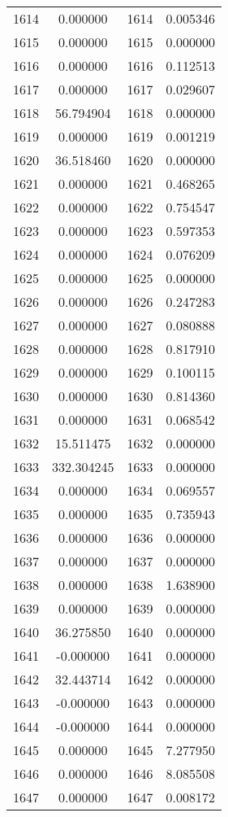 \documentclass[12pt]{article}
\begin{document}
\begin{longtable}{@{}cccc@{}}
1614 & 0.000000 & 1614 & 0.005346 \\
1615 & 0.000000 & 1615 & 0.000000 \\
1616 & 0.000000 & 1616 & 0.112513 \\
1617 & 0.000000 & 1617 & 0.029607 \\
1618 & 56.794904 & 1618 & 0.000000 \\
1619 & 0.000000 & 1619 & 0.001219 \\
1620 & 36.518460 & 1620 & 0.000000 \\
1621 & 0.000000 & 1621 & 0.468265 \\
1622 & 0.000000 & 1622 & 0.754547 \\
1623 & 0.000000 & 1623 & 0.597353 \\
1624 & 0.000000 & 1624 & 0.076209 \\
1625 & 0.000000 & 1625 & 0.000000 \\
1626 & 0.000000 & 1626 & 0.247283 \\
1627 & 0.000000 & 1627 & 0.080888 \\
1628 & 0.000000 & 1628 & 0.817910 \\
1629 & 0.000000 & 1629 & 0.100115 \\
1630 & 0.000000 & 1630 & 0.814360 \\
1631 & 0.000000 & 1631 & 0.068542 \\
1632 & 15.511475 & 1632 & 0.000000 \\
1633 & 332.304245 & 1633 & 0.000000 \\
1634 & 0.000000 & 1634 & 0.069557 \\
1635 & 0.000000 & 1635 & 0.735943 \\
1636 & 0.000000 & 1636 & 0.000000 \\
1637 & 0.000000 & 1637 & 0.000000 \\
1638 & 0.000000 & 1638 & 1.638900 \\
1639 & 0.000000 & 1639 & 0.000000 \\
1640 & 36.275850 & 1640 & 0.000000 \\
1641 & -0.000000 & 1641 & 0.000000 \\
1642 & 32.443714 & 1642 & 0.000000 \\
1643 & -0.000000 & 1643 & 0.000000 \\
1644 & -0.000000 & 1644 & 0.000000 \\
1645 & 0.000000 & 1645 & 7.277950 \\
1646 & 0.000000 & 1646 & 8.085508 \\
1647 & 0.000000 & 1647 & 0.008172 \\

\end{longtable}
\end{document}

